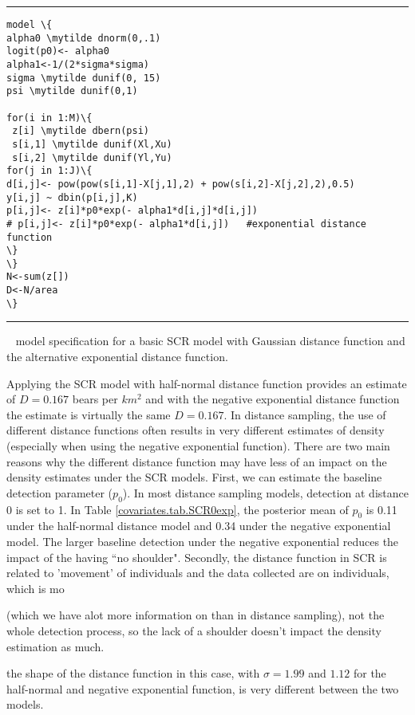 \begin{panel}[htp]
\centering
\rule[0.1in]{\textwidth}{.03in}
{\small
\begin{Verbatim}[commandchars=\\\{\}]
model \{
alpha0 \mytilde dnorm(0,.1)
logit(p0)<- alpha0
alpha1<-1/(2*sigma*sigma)
sigma \mytilde dunif(0, 15)
psi \mytilde dunif(0,1)

for(i in 1:M)\{
 z[i] \mytilde dbern(psi)
 s[i,1] \mytilde dunif(Xl,Xu)
 s[i,2] \mytilde dunif(Yl,Yu)
for(j in 1:J)\{
d[i,j]<- pow(pow(s[i,1]-X[j,1],2) + pow(s[i,2]-X[j,2],2),0.5)
y[i,j] ~ dbin(p[i,j],K)
p[i,j]<- z[i]*p0*exp(- alpha1*d[i,j]*d[i,j])
# p[i,j]<- z[i]*p0*exp(- alpha1*d[i,j])   #exponential distance function
\}
\}
N<-sum(z[])
D<-N/area
\}

\end{Verbatim}
}

\rule[-0.1in]{\textwidth}{.03in}
\caption{
\jags~ model specification for a basic SCR model with Gaussian
distance 
function and the alternative exponential distance function.}
\label{covariates.panel.basicSCR}
\end{panel}

Applying the SCR model with  half-normal
distance function provides an estimate of $D = 0.167$ bears per $km^2$ and with the
negative exponential distance function the estimate is virtually the 
same $D = 0.167$.  In distance sampling, the use of different distance functions often 
results in very different estimates of density (especially when using the negative 
exponential function).  There are two main reasons why the different distance function may
have less of an impact on the density estimates under the SCR models.  First, we can estimate
the baseline detection parameter ($p_0$).  In most distance sampling models, detection 
at distance 0 is set to 1.  In Table  \ref{covariates.tab.SCR0exp}, the posterior mean of $p_0$ is 
0.11 under the half-normal distance model and 0.34 under the negative exponential model.  The larger
baseline detection under the negative exponential reduces the impact of the having ``no shoulder". 
Secondly, the distance function in SCR is related to 'movement' of individuals and the data collected
are on individuals, which is mo

(which we have alot more information on than in distance sampling), not the whole detection process, so the lack of a shoulder doesn't impact the density estimation as much.   

the shape of the distance function in this case, with $\sigma = 1.99$ and $1.12$ for the 
half-normal and negative exponential function, is very different between
the two models.  

